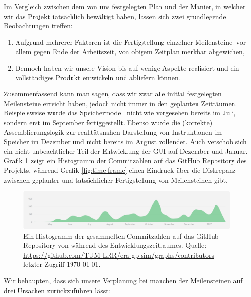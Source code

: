 Im Vergleich zwischen dem von uns festgelegten Plan und der Manier, in welcher wir das Projekt tatsächlich bewältigt haben, lassen sich zwei grundlegende Beobachtungen treffen:
\vspace{-0.2cm}
\begin{enumerate}
  \item Aufgrund mehrerer Faktoren ist die Fertigstellung einzelner Meilensteine, vor allem gegen Ende der Arbeitszeit, von obigem Zeitplan merkbar abgewichen,
  \item Dennoch haben wir unsere Vision bis auf wenige Aspekte realisiert und ein vollständiges Produkt entwickeln und abliefern können.
\end{enumerate}

Zusammenfassend kann man sagen, dass wir zwar alle initial festgelegten
Meilensteine erreicht haben, jedoch nicht immer in den geplanten Zeiträumen.
Beispielsweise wurde das Speichermodell nicht wie vorgesehen bereits im Juli,
sondern erst im September fertiggestellt. Ebenso wurde die (korrekte)
Assemblierungslogik zur realitätsnahen Darstellung von Instruktionen im Speicher
im Dezember und nicht bereits im August vollendet. Auch verschob sich ein nicht
unbeachtlicher Teil der Entwicklung der GUI auf Dezember und Januar. Grafik
\ref{fig:commit-history} zeigt ein Histogramm der Commitzahlen
auf das GitHub Repository des Projekts, während Grafik \ref{fig:time-frame}
einen Eindruck über die Diskrepanz zwischen geplanter und tatsächlicher
Fertigstellung von Meilensteinen gibt.

\begin{figure}[b!]
  \centering
  \includegraphics[scale=0.45]{figures/commit-history}
  \caption{Ein Histogramm der gesammelten Commitzahlen auf das GitHub Repository von \erasim{} während des Entwicklungszeitraumes. Quelle: {\small\url{https://github.com/TUM-LRR/era-gp-sim/graphs/contributors}}, letzter Zugriff \today.}
  \label{fig:commit-history}
\end{figure}

\pagebreak
Wir behaupten, dass sich unsere Verplanung bei manchen der Meilensteinen auf drei Ursachen zurückzuführen lässt:

